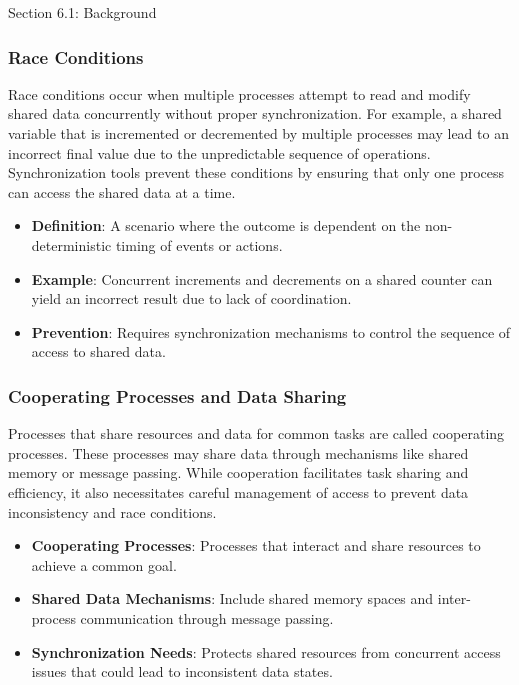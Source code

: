 \begin{notes}{Section 6.1: Background}
\begin{highlight}
    \end{highlight}
    
    \subsubsection*{Race Conditions}
    
    Race conditions occur when multiple processes attempt to read and modify shared data concurrently without proper synchronization. For example, a shared variable that is incremented or decremented 
    by multiple processes may lead to an incorrect final value due to the unpredictable sequence of operations. Synchronization tools prevent these conditions by ensuring that only one process can 
    access the shared data at a time.
    
    \begin{highlight}
    
        \begin{itemize}
            \item \textbf{Definition}: A scenario where the outcome is dependent on the non-deterministic timing of events or actions.
            \item \textbf{Example}: Concurrent increments and decrements on a shared counter can yield an incorrect result due to lack of coordination.
            \item \textbf{Prevention}: Requires synchronization mechanisms to control the sequence of access to shared data.
        \end{itemize}
    
    \end{highlight}
    
    \subsubsection*{Cooperating Processes and Data Sharing}
    
    Processes that share resources and data for common tasks are called cooperating processes. These processes may share data through mechanisms like shared memory or message passing. While cooperation 
    facilitates task sharing and efficiency, it also necessitates careful management of access to prevent data inconsistency and race conditions.
    
    \begin{highlight}
    
        \begin{itemize}
            \item \textbf{Cooperating Processes}: Processes that interact and share resources to achieve a common goal.
            \item \textbf{Shared Data Mechanisms}: Include shared memory spaces and inter-process communication through message passing.
            \item \textbf{Synchronization Needs}: Protects shared resources from concurrent access issues that could lead to inconsistent data states.
        \end{itemize}
    

\end{highlight}
\end{notes}
